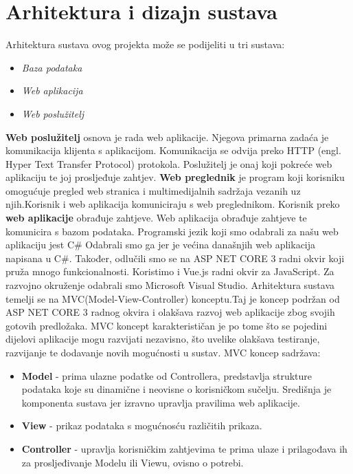 \chapter{Arhitektura i dizajn sustava}
		

		\textnormal{ Arhitektura sustava ovog projekta može se podijeliti u tri sustava:}
	\begin{itemize}
		\item 	\textit{Baza podataka}
		\item 	\textit{Web aplikacija}
		\item 	\textit{Web poslužitelj}		
	\end{itemize}
\textnormal {\textbf{Web poslužitelj} osnova je rada web aplikacije. Njegova primarna zadaća je komunikacija klijenta s aplikacijom. Komunikacija se odvija preko HTTP (engl. Hyper Text Transfer Protocol) protokola. Poslužitelj je onaj koji pokreće web aplikaciju te joj prosljeđuje zahtjev. \textbf{Web preglednik} je program koji korisniku omogućuje pregled web stranica i multimedijalnih sadržaja vezanih uz njih.Korisnik i web aplikacija komuniciraju s web preglednikom. Korisnik preko \textbf{web aplikacije} obrađuje zahtjeve. Web aplikacija obrađuje zahtjeve te komunicira s bazom podataka. }
\bigbreak
\textnormal {Programski jezik koji smo odabrali za našu web aplikaciju jest C\# Odabrali smo ga jer je većina današnjih web aplikacija napisana u C\#. Također, odlučili smo se na ASP NET CORE 3 radni okvir koji pruža mnogo funkcionalnosti. Koristimo i Vue.js radni okvir za JavaScript. Za razvojno okruženje odabrali smo Microsoft Visual Studio.}
\bigbreak
\textnormal{Arhitektura sustava temelji se na MVC(Model-View-Controller) konceptu.Taj je koncep podržan od ASP NET CORE 3 radnog okvira i olakšava razvoj web aplikacije zbog svojih gotovih predložaka. MVC koncept karakterističan je po tome što se pojedini dijelovi aplikacije mogu razvijati nezavisno, što uvelike olakšava testiranje, razvijanje te dodavanje novih mogućnosti u sustav. MVC koncep sadržava:}
\bigbreak
	\begin{itemize}
	\item 	\textbf{Model} - prima ulazne podatke od Controllera, predstavlja strukture podataka koje su dinamične i neovisne o korisničkom sučelju. Središnja je komponenta sustava jer izravno upravlja pravilima web aplikacije.
	\item 	\textbf{View} - prikaz podataka s mogućnosću različitih prikaza.
	\item 	\textbf{Controller}	- upravlja korisničkim zahtjevima te prima ulaze i prilagođava ih za prosljeđivanje Modelu ili Viewu, ovisno o potrebi.
\end{itemize}

